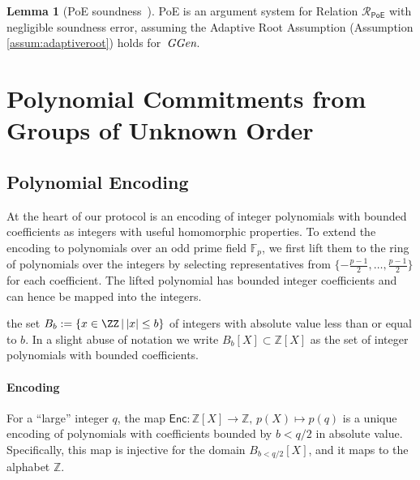 \documentclass{article}
\theoremstyle{definition}
\newtheorem{lemma}{Lemma}
\begin{document}
\begin{lemma}[\textsf{PoE} soundness~\cite{EC:Wesolowski19}]
\label{lem:poe}
\textsf{PoE} is an argument system for  Relation $\mathcal{R}_\textsf{PoE}$ with negligible soundness error,
assuming the Adaptive Root Assumption (Assumption \ref{assum:adaptiveroot}) holds for~$\textit{GGen}$.
\end{lemma}

\section{Polynomial Commitments from Groups of Unknown Order}
\label{sec:protocol}

\subsection{Polynomial Encoding}
\label{sec:encoding}
At the heart of our protocol is an encoding of integer polynomials with bounded coefficients as integers with useful homomorphic properties. To extend the encoding to polynomials over an odd prime field $\mathbb{F}_p$, we first lift them to the ring of polynomials over the integers by selecting representatives from $\{-\frac{p-1}{2}, \ldots, \frac{p-1}{2}\}$ for each coefficient. The lifted polynomial has bounded integer coefficients and can hence be mapped into the integers.

the set $B_{b}:=\{x \in \ZZ \, | \, \vert x \vert  \leq b\}$ of integers with absolute value less than or equal to $b$. In a slight abuse of notation we write $B_{b}[X]\subset \mathbb{Z}[X]$ as the set of integer polynomials with bounded coefficients. 

\paragraph{Encoding}
For a ``large'' integer $q$, the map $\mathsf{Enc} : \mathbb{Z}[X] \rightarrow \mathbb{Z}, \, p(X) \mapsto p(q)$ is a unique encoding of polynomials with coefficients bounded by $b<q/2$ in absolute value. Specifically, this map is injective for the domain $B_{b<q/2}[X]$, and it maps to the alphabet $\mathbb{Z}$. 
\end{document}
